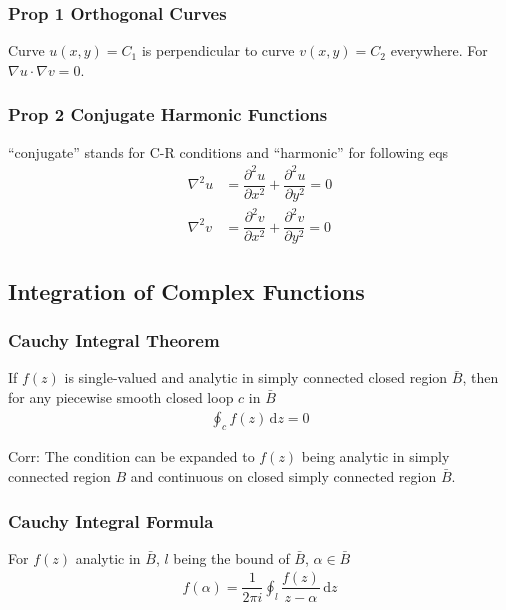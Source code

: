 \documentclass[10pt, a4paper]{article}
\def\D{\partial}
\def\d{\,\mathrm{d}}
\begin{document}
\begin{multicols}{2}
		\subsubsection{Prop 1 Orthogonal Curves}
			
			Curve $u(x,y) = C_1$ is perpendicular to curve $v(x,y) = C_2$ everywhere. For $\nabla u \cdot \nabla v = 0$.
		
		\subsubsection{Prop 2 Conjugate Harmonic Functions}
			
			``conjugate'' stands for C-R conditions and ``harmonic'' for following eqs	
			\begin{align}
				\nabla^2 u &= \dfrac{\D^2 u}{\D x^2} + \dfrac{\D^2 u}{\D y^2} = 0\\
				\nabla^2 v &= \dfrac{\D^2 v}{\D x^2} + \dfrac{\D^2 v}{\D y^2} = 0
			\end{align}
		
	\subsection{Integration of Complex Functions}
	
		\subsubsection{Cauchy Integral Theorem}
		
			If $f(z)$ is single-valued and analytic in simply connected closed region $\bar{B}$, then for any piecewise smooth closed loop $c$ in $\bar{B}$			
			\begin{align}
				\oint_c f(z) \d z = 0
			\end{align}
		
			Corr: The condition can be expanded to $f(z)$ being analytic in simply connected region $B$ and continuous on closed simply connected region $\bar{B}$.
		
		\subsubsection{Cauchy Integral Formula}
		
			For $f(z)$ analytic in $\bar{B}$, $l$ being the bound of $\bar{B}$, $\alpha \in \bar{B}$
			\begin{align}
				f(\alpha) = \dfrac{1}{2\pi i}\oint_l \dfrac{f(z)}{z - \alpha}\d z
			\end{align}
			

\end{multicols}
\end{document}
